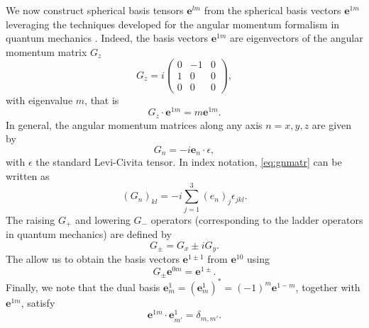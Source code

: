 We now construct spherical basis tensors $\mathbf e^{lm}$ from the spherical basis vectors $\mathbf e^{1m}$ leveraging the techniques developed for the angular momentum formalism in quantum mechanics \citep{Zettili2009,Snider2018}.
%
Indeed, the basis vectors $\mathbf e^{1m}$ are eigenvectors of the angular momentum matrix $G_z$
%
\begin{equation}
    G_z=i
  \begin{pmatrix}
    0 & -1 & 0\\
    1 &  0 & 0\\
    0 &  0 & 0
  \end{pmatrix},
\end{equation}
%
with eigenvalue $m$, that is
%
\begin{equation}
    G_z \cdot \mathbf e^{1m} = m \mathbf e^{1m}.
\end{equation}
%
In general, the angular momentum matrices along any axis $n={x,y,z}$ are given by
%
\begin{equation}
    G_{n} = -i \mathbf e_{n} \cdot \epsilon,
\label{eq:gnmatr}
\end{equation}
%
with $\epsilon$ the standard Levi-Civita tensor.
%
In index notation, \cref{eq:gnmatr} can be written as
%
\begin{equation}
    \left({G_{n}}\right)_{kl}=-i\sum_{j=1}^3\left(e_{n}\right)_j \epsilon_{jkl}.
\end{equation}
%
The raising $G_+$ and lowering $G_-$ operators (corresponding to the ladder operators in quantum mechanics) are defined by
%
\begin{equation}
    G_{\pm}=G_x \pm i G_y.
\end{equation}
%
The allow us to obtain the basis vectors $\mathbf e^{1\pm1}$ from $\mathbf e^{10}$ using
%
\begin{equation}
    G_{\pm}\mathbf e^{0m}=\mathbf e^{1\pm}.
\end{equation}
%
Finally, we note that  the dual basis $\mathbf e^{1}_m = (\mathbf e^{1}_m)^* = (-1)^m \mathbf e^{1-m}$, together with $\mathbf e^{1m}$, satisfy
%
\begin{equation}
    \mathbf e^{1m} \cdot \mathbf e^{1}_{m'} = \delta_{m,m'}.
\label{eq:orthoe}
\end{equation}

